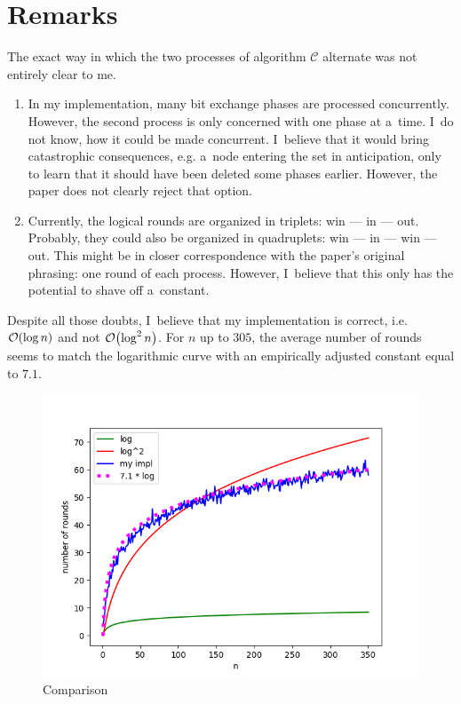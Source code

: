 \documentclass{article}
\DeclarePairedDelimiter{\parenthesesdelimiter}{(}{)}
\def\pars{\parenthesesdelimiter*}
\newcommand{\bigO}{\mathcal{O}}
\begin{document}
\section{Remarks}
The exact way in which the two processes of algorithm \(\mathcal{C}\) alternate was not entirely clear to me.
\begin{enumerate}
    \item In my implementation, many bit exchange phases are processed concurrently. However, the second process is only concerned with one phase at a~time. I~do not know, how it could be made concurrent. I~believe that it would bring catastrophic consequences, e.g. a~node entering the set in anticipation, only to learn that it should have been deleted some phases earlier. However, the paper does not clearly reject that option.
    \item Currently, the logical rounds are organized in triplets: win --- in --- out. Probably, they could also be organized in quadruplets: win --- in --- win --- out. This might be in closer correspondence with the paper's original phrasing: one round of each process. However, I~believe that this only has the potential to shave off a~constant.
\end{enumerate}
Despite all those doubts, I~believe that my implementation is correct, i.e. \(\bigO\pars{\log n}\) and not \(\bigO\pars{\log^2n}\). For \(n\) up to \(305\), the average number of rounds seems to match the logarithmic curve with an empirically adjusted constant equal to \(7.1\).
\begin{figure}[H]
    \centering
    \includegraphics{comparison.png}
    \caption{Comparison}
\end{figure}



\end{document}
